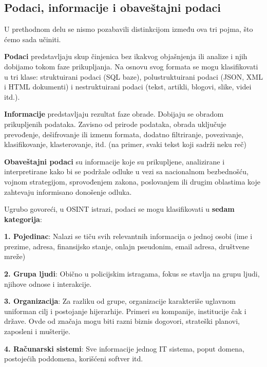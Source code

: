 \documentclass[fleqn, 12pt]{article}
\begin{document}
\subsection{Podaci, informacije i obaveštajni podaci}
U prethodnom delu se nismo pozabavili distinkcijom između ova tri pojma, što ćemo sada učiniti.\newline

{\bf Podaci} predstavljaju skup činjenica bez ikakvog objašnjenja ili analize i njih dobijamo tokom faze prikupljanja. Na osnovu svog formata se mogu klasifikovati u tri klase: struktuirani podaci (SQL baze), polustruktuirani podaci (JSON, XML i HTML dokumenti) i nestruktuirani podaci (tekst, artikli, blogovi, slike, videi itd.).\newline

{\bf Informacije} predstavljaju rezultat faze obrade. Dobijaju se obradom prikupljenih podataka. Zavisno od prirode podataka, obrada uključuje prevođenje, dešifrovanje ili izmenu formata, dodatno filtriranje, povezivanje, klasifikovanje, klasterovanje, itd. (na primer, svaki tekst koji sadrži neku reč)\newline

{\bf Obaveštajni podaci} su informacije koje su prikupljene, analizirane i interpretirane kako bi se podržale odluke u vezi sa nacionalnom bezbednošću, vojnom strategijom, sprovođenjem zakona, poslovanjem ili drugim oblastima koje zahtevaju informisano donošenje odluka. \newline

Ugrubo govoreći, u OSINT istrazi, podaci se mogu klasifikovati u {\bf sedam kategorija}:\newline

{\bf 1. Pojedinac}: Nalazi se tiču svih relevantnih informacija o jednoj osobi (ime i prezime, adresa, finansijsko stanje, onlajn pseudonim, email adresa, društvene mreže)\newline

{\bf 2. Grupa ljudi}: Obično u policijskim istragama, fokus se stavlja na grupu ljudi, njihove odnose i interakcije.\newline

{\bf 3. Organizacija}: Za razliku od grupe, organizacije karakteriše uglavnom uniforman cilj i postojanje hijerarhije. Primeri su kompanije, institucije čak i države. Ovde od značaja mogu biti razni biznis dogovori, strateški planovi, zaposleni i mušterije.\newline

{\bf 4. Računarski sistemi}: Sve informacije jednog IT sistema, poput domena, postojećih  poddomena, korišćeni softver itd.\newline
\end{document}
